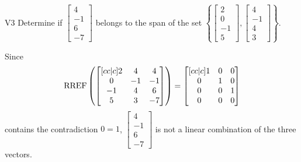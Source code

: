 \begin{problem}{V3}
  Determine if
  \(\begin{bmatrix} 4 \\ -1 \\ 6 \\ -7 \end{bmatrix}\)
  belongs to the span of the set
  \(\left\{
    \begin{bmatrix} 2 \\ 0 \\ -1 \\ 5 \end{bmatrix},
    \begin{bmatrix} 4 \\ -1 \\ 4 \\ 3 \end{bmatrix}
    \right\}
  \).
\end{problem}
\begin{solution}
  Since
  \[
    \operatorname{RREF}\left(
      \begin{bmatrix}[cc|c]
        2 & 4 & 4 \\
        0 & -1 & -1 \\
        -1 & 4 & 6 \\
        5 & 3 & -7
      \end{bmatrix}
    \right) =
    \begin{bmatrix}[cc|c]
      1 & 0 & 0 \\
      0 & 1 & 0 \\
      0 & 0 & 1 \\
      0 & 0 & 0
    \end{bmatrix}
  \]
  contains the contradiction \(0=1\),
  \(\begin{bmatrix} 4 \\ -1 \\ 6 \\ -7 \end{bmatrix}\) is
  not a linear combination of the three vectors.
\end{solution}


